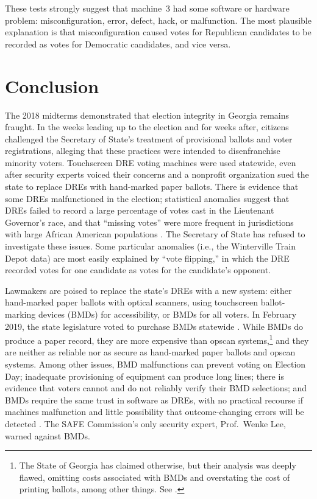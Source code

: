 \documentclass[runningheads]{llncs}
\begin{document}
These tests strongly suggest that machine~3 had some software or hardware problem: 
misconfiguration, error, defect, hack, or malfunction. 
The most plausible explanation is that misconfiguration caused votes 
for Republican candidates to be recorded as votes for Democratic candidates, and vice versa.


\section{Conclusion}
The 2018 midterms demonstrated that election integrity in Georgia remains fraught.
In the weeks leading up to the election and for weeks after, citizens challenged the
Secretary of State's treatment of provisional ballots and voter registrations,
alleging that these practices were intended to disenfranchise minority voters.
Touchscreen DRE voting machines were used statewide, even after
security experts voiced their concerns and a nonprofit organization sued the state to replace DREs
with hand-marked paper ballots.
There is evidence that some DREs malfunctioned in the election;
statistical anomalies suggest that DREs failed to record a large percentage of votes cast in the Lieutenant Governor's race, and that ``missing votes'' were more frequent in jurisdictions
with large African American populations \cite{harriot_thousands_2019}.
The Secretary of State has refused to investigate these issues.
Some particular anomalies (i.e., the Winterville Train Depot data) are most easily explained by 
``vote flipping,'' in which the DRE recorded votes for one candidate
as votes for the candidate's opponent.

Lawmakers are poised to replace the state's DREs with a new system:
either hand-marked paper ballots with optical scanners, using
touchscreen ballot-marking devices (BMDs) for accessibility, or BMDs for all voters.
In February 2019, the state legislature voted to purchase BMDs statewide \cite{niesse_bill_2019}.
While BMDs do produce a paper record, they are more expensive than opscan systems,\footnote{%
  The State of Georgia has claimed otherwise, but their analysis was deeply flawed, omitting costs associated with BMDs and overstating the cost of printing ballots, among other things. See \cite{perez18}.
  }%
and they are neither as reliable nor as secure as hand-marked
paper ballots and opscan systems.
Among other issues, BMD malfunctions can prevent voting on Election Day;
inadequate provisioning of equipment can produce long lines;
there is evidence that voters cannot and do not reliably verify their BMD selections; 
and BMDs require the same trust in software as DREs, with no practical recourse if machines malfunction and little possibility that outcome-changing errors will be detected \cite{appel_bmds_2019,stark_bmds_2019}.
The SAFE Commission's only security expert, Prof.~Wenke Lee, warned against BMDs.
\end{document}
